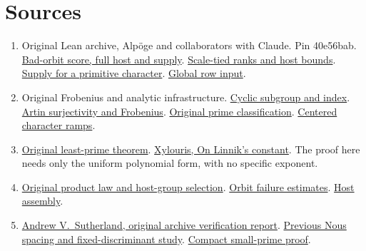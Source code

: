 \documentclass[12pt,letterpaper]{article}
\DeclareRobustCommand{\id}[1]{\mbox{\small\ttfamily #1}}
\newcommand{\old}[3]{\href{https://github.com/nousentllc/riemann-hypothesis/blob/40e56bab026552e089d7afcfeff08d2defb9c005/src/#1\#L#2}{#3}}
\begin{document}
\section{Sources}
\begin{enumerate}[leftmargin=*,nosep]\small
\item Original Lean archive, Alp\"oge and collaborators with Claude. Pin \id{40e56bab}. \old{Development/AbelianVarietyTheory/Definitions/GlobalTwisting/ThinScalesIffHostBound.lean}{36}{Bad-orbit score, full host and supply}. \old{Development/AbelianVarietyTheory/Definitions/GlobalTwisting/PairRowIffQdRows.lean}{28}{Scale-tied ranks and host bounds}. \old{Development/AutomorphicArithmetic/CharacterBoxes/SupplyChi.lean}{8}{Supply for a primitive character}. \old{Development/AutomorphicArithmetic/CharacterBoxes/MainConclusion.lean}{7}{Global row input}.
\item Original Frobenius and analytic infrastructure. \old{Formalism/SharpRestriction/RamificationFrobenius/TotientGaloisClasses/FrameFacts.lean}{204}{Cyclic subgroup and index}. \old{Formalism/SharpRestriction/RamificationFrobenius/TotientGaloisClasses/ConjEMemHostFIff.lean}{87}{Artin surjectivity and Frobenius}. \old{Formalism/LocalRingCardinality/RankBoundMonotoneInDimension.lean}{568}{Original prime classification}. \old{Formalism/SharpRestriction/RamificationFrobenius/TotientGaloisClasses/Analytic.lean}{23}{Centered character ramps}.
\item \old{Development/AutomorphicArithmetic/ThetaCorrespondence/Linnik.lean}{142}{Original least-prime theorem}. \href{https://arxiv.org/abs/0906.2749}{Xylouris, On Linnik's constant}. The proof here needs only the uniform polynomial form, with no specific exponent.
\item \old{Development/AutomorphicArithmetic/ThickFrames/topsGroup.lean}{58}{Original product law and host-group selection}. \old{Development/AutomorphicArithmetic/ThickFrames/orbitTerms.lean}{97}{Orbit failure estimates}. \old{Development/AutomorphicArithmetic/ShortNorms/hostOfFieldOf.lean}{159}{Host assembly}.
\item \href{https://math.mit.edu/~drew/grh/}{Andrew V.\ Sutherland, original archive verification report}. \href{https://github.com/nousentllc/riemann-hypothesis/tree/d5cdf95bdb5634d812782c464e799f8f5d0546ee/research/uriel/experiments/frobenius-spacing}{Previous Nous spacing and fixed-discriminant study}. \href{https://github.com/lsernau/grh-lean/blob/72fead102f663d5c7a407964a13dc0cf9d977207/grh-compact/src/New/Curve/DepthPairs.lean#L60}{Compact small-prime proof}.
\end{enumerate}
\end{document}
